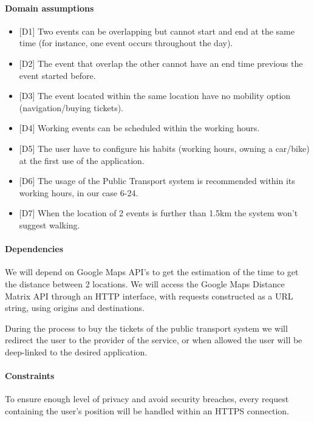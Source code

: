 \paragraph{Domain assumptions}
\begin{itemize}
\item {[D1]} Two events can be overlapping but cannot start and end at the same time (for instance, one event occurs throughout the day).
\item {[D2]} The event that overlap the other cannot have an end time previous the event started before.
\item {[D3]} The event located within the same location have no mobility option (navigation/buying tickets).
\item {[D4]} Working events can be scheduled within the working hours.
\item {[D5]} The user have to configure his habits (working hours, owning a car/bike) at the first use of the application.
\item {[D6]} The usage of the Public Transport system is recommended within its working hours, in our case 6-24.
\item {[D7]} When the location of 2 events is further than 1.5km the system won't suggest walking.
\end{itemize}

\paragraph{Dependencies}
\begin{description}
\item We will depend on Google Maps API’s to get the estimation of the time to get the distance between 2 locations. 
We will access the Google Maps Distance Matrix API through an HTTP interface, with requests constructed as a URL string, using origins and destinations.
\item During the process to buy the tickets of the public transport system we will redirect the user to the provider of the service, or when allowed the user will be deep-linked to the desired application.
\end{description}


\paragraph{Constraints}
\begin{description}
\item To ensure enough level of privacy and avoid security breaches, every request containing the user’s position will be handled within an HTTPS connection.
\end{description}
